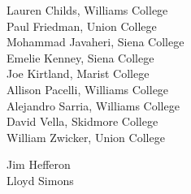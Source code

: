 \documentclass{hrumc}
\begin{document}
{\setlength{\parskip}{1.5ex}
\setlength{\parindent}{0ex}

\vspace{2ex plus 1fil}

\vspace{2ex plus 1fil}
\begin{minipage}{\textwidth}
  \begin{hrumcsteering}
  Lauren Childs, Williams College        \\
  Paul Friedman, Union College           \\
  Mohammad Javaheri, Siena College       \\
  Emelie Kenney, Siena College           \\
  Joe Kirtland, Marist College           \\
  Allison Pacelli, Williams College      \\
  Alejandro Sarria, Williams College     \\
  David Vella, Skidmore College          \\
  William Zwicker, Union College
  \end{hrumcsteering}
  \hspace{5em plus 1fill}
  \begin{localsteering}
  Jim Hef{}feron \\
  Lloyd Simons  
  \end{localsteering}
\end{minipage}
}
\clearpage
\end{document}
